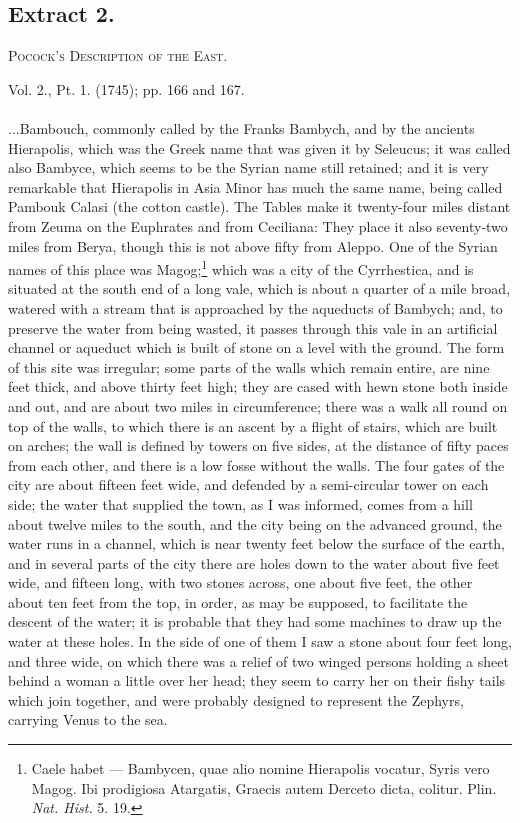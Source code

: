 \documentclass[a4paper, 11pt, oneside, polutonikogreek, english]{article}
\begin{document}
\subsection{Extract 2.}
\begin{center}
\textsc{Pocock's Description of the East.}

Vol. 2., Pt. 1. (1745); pp. 166 and 167.
\end{center}
\paragraph{}
...Bambouch, commonly called by the Franks Bambych, and by the ancients Hierapolis, which was the Greek name that was given it by Seleucus; it was called also Bambyce, which seems to be the Syrian name still retained; and it is very remarkable that Hierapolis in Asia Minor has much the same name, being called Pambouk Calasi (the cotton castle). The Tables make it twenty-four miles distant from Zeuma on the Euphrates and from Ceciliana: They place it also seventy-two miles from Berya, though this is not above fifty from Aleppo. One of the Syrian names of this place was Magog;\footnote{Caele habet --- Bambycen, quae alio nomine Hierapolis vocatur, Syris vero Magog. Ibi prodigiosa Atargatis, Graecis autem Derceto dicta, colitur. Plin. \emph{Nat. Hist.} 5. 19.} which was a city of the Cyrrhestica, and is situated at the south end of a long vale, which is about a quarter of a mile broad, watered with a stream that is approached by the aqueducts of Bambych; and, to preserve the water from being wasted, it passes through this vale in an artificial channel or aqueduct which is built of stone on a level with the ground. The form of this site was irregular; some parts of the walls which remain entire, are nine feet thick, and above thirty feet high; they are cased with hewn stone both inside and out, and are about two miles in circumference; there was a walk all round on top of the walls, to which there is an ascent by a flight of stairs, which are built on arches; the wall is defined by towers on five sides, at the distance of fifty paces from each other, and there is a low fosse without the walls. The four gates of the city are about fifteen feet wide, and defended by a semi-circular tower on each side; the water that supplied the town, as I was informed, comes from a hill about twelve miles to the south, and the city being on the advanced ground, the water runs in a channel, which is near twenty feet below the surface of the earth, and in several parts of the city there are holes down to the water about five feet wide, and fifteen long, with two stones across, one about five feet, the other about ten feet from the top, in order, as may be supposed, to facilitate the descent of the water; it is probable that they had some machines to draw up the water at these holes. In the side of one of them I saw a stone about four feet long, and three wide, on which there was a relief of two winged persons holding a sheet behind a woman a little over her head; they seem to carry her on their fishy tails which join together, and were probably designed to represent the Zephyrs, carrying Venus to the sea.
\end{document}
